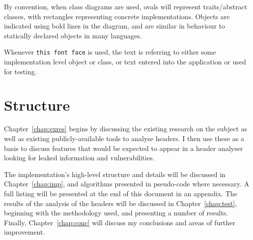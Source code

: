\documentclass[twoside,10pt]{scrreprt}
\begin{document}
    By convention, when class diagrams are used, ovals will represent
    traits/abstract classes, with rectangles representing concrete
    implementations. Objects are indicated using bold lines in the diagram, and
    are similar in behaviour to statically declared objects in many languages.

    Whenever \texttt{this font face} is used, the text is referring to either
    some implementation level object or class, or text entered into the
    application or used for testing.


    \section{Structure}

    Chapter~\ref{chap:exres} begins by discussing the existing research on
    the subject as well as existing publicly-available tools to analyse
    headers.  I then use these as a basis to discuss features that would be
    expected to appear in a header analyser looking for leaked information
    and vulnerabilities.

    The implementation's high-level structure and details will be discussed in
    Chapter~\ref{chap:imp}, and algorithms presented in pseudo-code where
    necessary.  A full listing will be presented at the end of this document in
    an appendix. The results of the analysis of the headers will be discussed in
    Chapter~\ref{chap:test}, beginning with the methodology used, and presenting
    a number of results. Finally, Chapter~\ref{chap:conc} will discuss my
    conclusions and areas of further improvement.

     
     

    \printbibliography{} 
\end{document}
